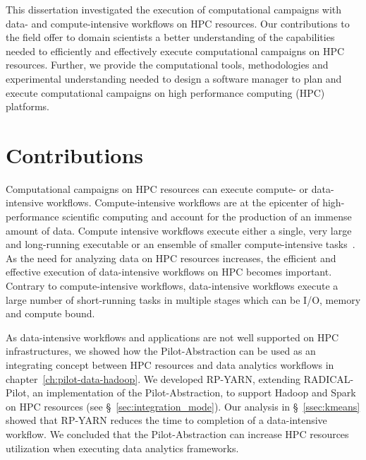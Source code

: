 
This dissertation investigated the execution of computational campaigns with
data- and compute-intensive workflows on HPC resources. Our contributions to the
field offer to domain scientists a better understanding of the capabilities
needed to efficiently and effectively execute computational campaigns on HPC
resources. Further, we provide the computational tools, methodologies and
experimental understanding needed to design a software manager to plan and
execute computational campaigns on high performance computing (HPC)
platforms.

\section{Contributions}

Computational campaigns on HPC resources can execute compute- or data- intensive
workflows. Compute-intensive workflows are at the epicenter of high-performance
scientific computing and account for the production of an immense amount of
data. Compute intensive workflows execute either a single, very large and
long-running executable or an ensemble of smaller compute-intensive
tasks~\cite{balasubramanian2018harnessing}. As the need for analyzing data on
HPC resources increases, the efficient and effective execution of data-intensive
workflows on HPC becomes important. Contrary to compute-intensive workflows,
data-intensive workflows execute a large number of short-running tasks in
multiple stages which can be I/O, memory and compute bound.

As data-intensive workflows and applications are not well supported on HPC
infrastructures, we showed how the Pilot-Abstraction can be used as an
integrating concept between HPC resources and data analytics workflows in
chapter~\ref{ch:pilot-data-hadoop}. We developed RP-YARN, extending
RADICAL-Pilot, an implementation of the Pilot-Abstraction, to support Hadoop and
Spark on HPC resources (see \S~\ref{sec:integration_mode}). Our analysis in
\S~\ref{ssec:kmeans} showed that RP-YARN reduces the time to completion of a
data-intensive workflow. We concluded that the Pilot-Abstraction can increase
HPC resources utilization when executing data analytics frameworks.

